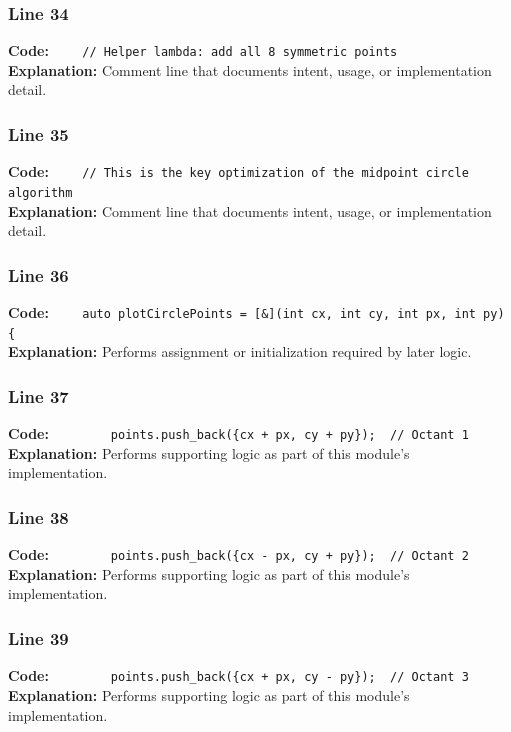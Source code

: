 \documentclass[11pt,a4paper]{article}
\begin{document}
\subsubsection*{Line 34}
\textbf{Code:} \verb|    // Helper lambda: add all 8 symmetric points|\\
\textbf{Explanation:} Comment line that documents intent, usage, or implementation detail.

\subsubsection*{Line 35}
\textbf{Code:} \verb|    // This is the key optimization of the midpoint circle algorithm|\\
\textbf{Explanation:} Comment line that documents intent, usage, or implementation detail.

\subsubsection*{Line 36}
\textbf{Code:} \verb|    auto plotCirclePoints = [&](int cx, int cy, int px, int py) {|\\
\textbf{Explanation:} Performs assignment or initialization required by later logic.

\subsubsection*{Line 37}
\textbf{Code:} \verb|        points.push_back({cx + px, cy + py});  // Octant 1|\\
\textbf{Explanation:} Performs supporting logic as part of this module's implementation.

\subsubsection*{Line 38}
\textbf{Code:} \verb|        points.push_back({cx - px, cy + py});  // Octant 2|\\
\textbf{Explanation:} Performs supporting logic as part of this module's implementation.

\subsubsection*{Line 39}
\textbf{Code:} \verb|        points.push_back({cx + px, cy - py});  // Octant 3|\\
\textbf{Explanation:} Performs supporting logic as part of this module's implementation.
\end{document}
